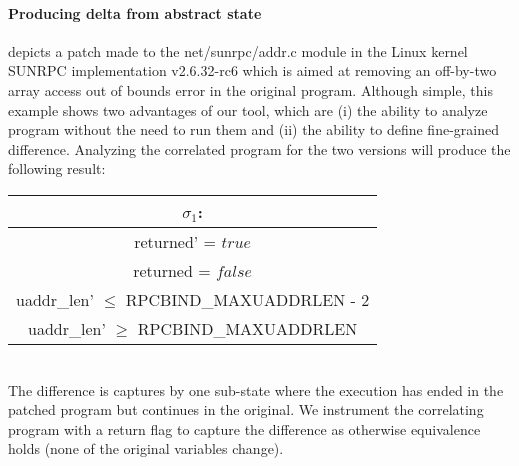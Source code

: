 
\paragraph{Producing delta from abstract state}



 depicts a patch made to the net/sunrpc/addr.c module in the Linux kernel SUNRPC implementation v2.6.32-rc6 which is aimed at removing an off-by-two array access out of bounds error in the original program. Although simple, this example shows two advantages of our tool, which are (i) the ability to analyze program without the need to run them and (ii) the ability to define fine-grained difference. Analyzing the correlated program for the two versions will produce the following result:
\\
\begin{tabular}{c}
$\sigma_1$:
\\ \hline
returned' = $true$
\\
returned = $false$
\\
uaddr\_len' $\leq$ RPCBIND\_MAXUADDRLEN - 2
\\
uaddr\_len' $\geq$ RPCBIND\_MAXUADDRLEN
\\ \hline
\end{tabular}
\\
The difference is captures by one sub-state where the execution has ended in the patched program but continues in the original. We instrument the correlating program with a return flag to capture the difference as otherwise equivalence holds (none of the original variables change).

